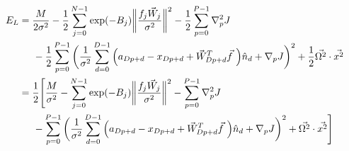 \documentclass[12pt]{article}
\begin{document}
\begin{align*}
E_L &= \frac{M}{2\sigma^2} - \frac{1}{2} \sum_{j=0}^{N-1} \exp(-B_j) \bigg\| \frac{f_j \vec{W}_j}{\sigma^2} \bigg\|^2 - \frac{1}{2} \sum_{p=0}^{P-1} \nabla_p^2  J\\
& \hspace*{5 mm} -\frac{1}{2} \sum_{p=0}^{P-1} \bigg( \frac{1}{\sigma^2} \sum_{d=0}^{D-1} \Big( a_{Dp+d}-x_{Dp+d} + \vec{W}_{Dp+d}^T \vec{f} \  \Big) \hat{n}_d
 + \nabla_p  J \bigg)^2 + \frac{1}{2} \vec{\Omega^2} \cdot \vec{x^2}\\
&= \frac{1}{2} \Bigg[ \frac{M}{\sigma^2} - \sum_{j=0}^{N-1} \exp(-B_j) \bigg\| \frac{f_j \vec{W}_j}{\sigma^2} \bigg\|^2 - \sum_{p=0}^{P-1} \nabla_p^2  J\\
& \hspace*{5 mm} -\sum_{p=0}^{P-1} \bigg( \frac{1}{\sigma^2} \sum_{d=0}^{D-1} \Big( a_{Dp+d}-x_{Dp+d} + \vec{W}_{Dp+d}^T \vec{f} \  \Big) \hat{n}_d
 + \nabla_p  J \bigg)^2 + \vec{\Omega^2} \cdot \vec{x^2} \Bigg] \\
\end{align*}
\end{document}
